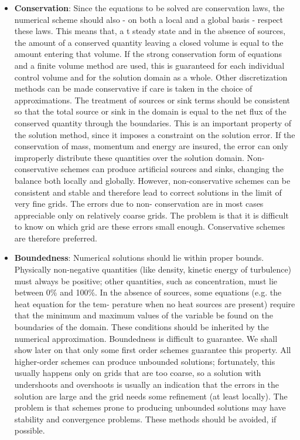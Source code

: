\begin{itemize}
 \item \textbf{Conservation}: Since the equations to be solved are conservation laws, the numerical scheme
should also - on both a local and a global basis - respect these laws. This
means that, a t steady state and in the absence of sources, the amount of a
conserved quantity leaving a closed volume is equal to the amount entering
that volume. If the strong conservation form of equations and a finite volume
method are used, this is guaranteed for each individual control volume and
for the solution domain as a whole. Other discretization methods can be made
conservative if care is taken in the choice of approximations. The treatment
of sources or sink terms should be consistent so that the total source or sink
in the domain is equal to the net flux of the conserved quantity through the
boundaries.
This is an important property of the solution method, since it imposes a
constraint on the solution error. If the conservation of mass, momentum and
energy are insured, the error can only improperly distribute these quantities
over the solution domain. Non-conservative schemes can produce artificial
sources and sinks, changing the balance both locally and globally. However,
non-conservative schemes can be consistent and stable and therefore lead
to correct solutions in the limit of very fine grids. The errors due to non-
conservation are in most cases appreciable only on relatively coarse grids.
The problem is that it is difficult to know on which grid are these errors
small enough. Conservative schemes are therefore preferred.

 \item \textbf{Boundedness}: Numerical solutions should lie within proper bounds. Physically non-negative
quantities (like density, kinetic energy of turbulence) must always be positive;
other quantities, such as concentration, must lie between 0\% and 100\%. In
the absence of sources, some equations (e.g. the heat equation for the tem-
perature when no heat sources are present) require that the minimum and
maximum values of the variable be found on the boundaries of the domain.
These conditions should be inherited by the numerical approximation.
Boundedness is difficult to guarantee. We shall show later on that only
some first order schemes guarantee this property. All higher-order schemes
can produce unbounded solutions; fortunately, this usually happens only on
grids that are too coarse, so a solution with undershoots and overshoots
is usually an indication that the errors in the solution are large and the
grid needs some refinement (at least locally). The problem is that schemes
prone to producing unbounded solutions may have stability and convergence
problems. These methods should be avoided, if possible.


\end{itemize}
